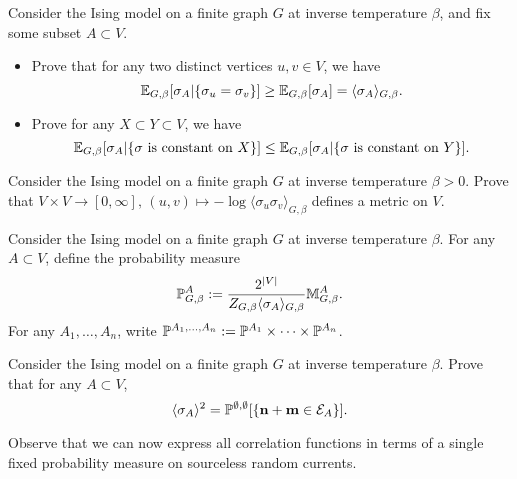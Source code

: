 \begin{exercise}
    \label{exo:conditioning_equality}
    Consider the Ising model on a finite graph $G$
    at inverse temperature $\beta$, and fix some subset $A\subset V$.
    \begin{itemize}
        \item     Prove that for any two distinct vertices $u,v\in V$,
        we have
        \[
            \E_{G,\beta}[\sigma_A|\{\sigma_u=\sigma_v\}]
            \geq
            \E_{G,\beta}[\sigma_A]=\langle\sigma_A\rangle_{G,\beta}.
        \]
        \item Prove for any $X\subset Y\subset V$, we have
        \[
            \E_{G,\beta}[\sigma_A|\{\text{$\sigma$ is constant on $X$}\}]
            \leq
            \E_{G,\beta}[\sigma_A|\{\text{$\sigma$ is constant on $Y$}\}]
            .
        \]
    \end{itemize}
\end{exercise}

\begin{exercise}
    Consider the Ising model on a finite graph $G$
    at inverse temperature $\beta>0$.
    Prove that $V\times V\to [0,\infty],\,
    (u,v)\mapsto-\log\langle\sigma_u\sigma_v\rangle_{G,\beta}$
    defines a metric on $V$.
\end{exercise}

\begin{definition}
    Consider the Ising model on a finite graph $G$
    at inverse temperature $\beta$.
    For any $A\subset V$,
    define the probability measure
    \[
        \P^A_{G,\beta}:=\frac{2^{|V|}}{Z_{G,\beta}\langle\sigma_A\rangle_{G,\beta}}\M^A_{G,\beta}.
    \]
    For any $A_1,\ldots,A_n$,
    write $\P^{A_1,\ldots,A_n}:=\P^{A_1}\times\cdots\times\P^{A_n}$.
\end{definition}

\begin{exercise}
    Consider the Ising model on a finite graph $G$
    at inverse temperature $\beta$.
    Prove that for any $A\subset V$,
    \[
        \langle\sigma_A\rangle^2
        =
        \P^{\emptyset,\emptyset}[\{\n+\m\in\calE_A\}].
    \]

    Observe that we can now express all correlation functions in terms of a single
    fixed probability measure on sourceless random currents.
\end{exercise}

